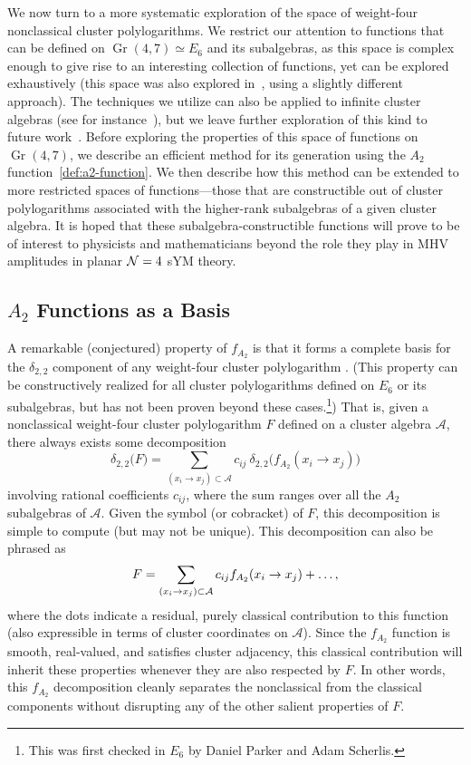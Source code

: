 \documentclass[12pt]{article}
\DeclareMathOperator{\Gr}{Gr}
\def\a{\mathcal{A}}
\def\pdfeq#1{\texorpdfstring{$#1$}{a}}
\begin{document}
We now turn to a more systematic exploration of the space of weight-four nonclassical cluster polylogarithms. We restrict our attention to functions that can be defined on $\Gr(4,7) \simeq E_6$ and its subalgebras, as this space is complex enough to give rise to an interesting collection of functions, yet can be explored exhaustively (this space was also explored in~\cite{Harrington:2015bdt}, using a slightly different approach). The techniques we utilize can also be applied to infinite cluster algebras (see for instance~\cite{Golden:2014xqa}), but we leave further exploration of this kind to future work~\cite{cluster_subalgebras_ii}. Before exploring the properties of this space of functions on $\Gr(4,7)$, we describe an efficient method for its generation using the $A_2$ function~\eqref{def:a2-function}. We then describe how this method can be extended to more restricted spaces of functions---those that are constructible out of cluster polylogarithms associated with the higher-rank subalgebras of a given cluster algebra. It is hoped that these subalgebra-constructible functions will prove to be of interest to physicists and mathematicians beyond the role they play in MHV amplitudes in planar ${\cal N}=4$ sYM theory. 

\subsection{\pdfeq{A_2} Functions as a Basis}

A remarkable (conjectured) property of $f_{A_2}$ is that it forms a complete basis for the $\delta_{2,2}$ component of any weight-four cluster polylogarithm \cite{Golden:2014xqa}. (This property can be constructively realized for all cluster polylogarithms defined on $E_6$ or its subalgebras, but has not been proven beyond these cases.\footnote{This was first checked in $E_6$ by Daniel Parker and
Adam Scherlis.}) That is, given a nonclassical weight-four cluster polylogarithm $F$ defined on a cluster algebra $\a$, there always exists some decomposition
\begin{equation}\label{eq:a2-decomp}
	\delta_{2,2} \big(F\big) = \sum_{(x_i\to x_j) \subset \a} c_{ij} ~\delta_{2,2}\big(f_{A_2}(x_i \to x_j) \big) 
\end{equation}
involving rational coefficients $c_{ij}$, where the sum ranges over all the $A_2$ subalgebras of $\a$. Given the symbol (or cobracket) of $F$, this decomposition is simple to compute (but may not be unique). This decomposition can also be phrased as 
\begin{equation}\label{eq:a2-decomp-full}
	F = \sum_{(x_i\to x_j) \subset \a} c_{ij} f_{A_2}(x_i \to x_j) + \dots, \vspace{-.1cm}
\end{equation}
where the dots indicate a residual, purely classical contribution to this function (also expressible in terms of cluster coordinates on $\a$). Since the $f_{A_2}$ function is smooth, real-valued, and satisfies cluster adjacency, this classical contribution will inherit these properties whenever they are also respected by $F$. In other words, this $f_{A_2}$ decomposition cleanly separates the nonclassical from the classical components without disrupting any of the other salient properties of $F$. 
\end{document}
